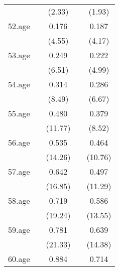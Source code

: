 {\begin{tabular}{l*{4}{c}}
            &                     &      (2.33)         &                     &      (1.93)         \\
[1em]
52.age      &                     &       0.176\sym{***}&                     &       0.187\sym{***}\\
            &                     &      (4.55)         &                     &      (4.17)         \\
[1em]
53.age      &                     &       0.249\sym{***}&                     &       0.222\sym{***}\\
            &                     &      (6.51)         &                     &      (4.99)         \\
[1em]
54.age      &                     &       0.314\sym{***}&                     &       0.286\sym{***}\\
            &                     &      (8.49)         &                     &      (6.67)         \\
[1em]
55.age      &                     &       0.480\sym{***}&                     &       0.379\sym{***}\\
            &                     &     (11.77)         &                     &      (8.52)         \\
[1em]
56.age      &                     &       0.535\sym{***}&                     &       0.464\sym{***}\\
            &                     &     (14.26)         &                     &     (10.76)         \\
[1em]
57.age      &                     &       0.642\sym{***}&                     &       0.497\sym{***}\\
            &                     &     (16.85)         &                     &     (11.29)         \\
[1em]
58.age      &                     &       0.719\sym{***}&                     &       0.586\sym{***}\\
            &                     &     (19.24)         &                     &     (13.55)         \\
[1em]
59.age      &                     &       0.781\sym{***}&                     &       0.639\sym{***}\\
            &                     &     (21.33)         &                     &     (14.38)         \\
[1em]
60.age      &                     &       0.884\sym{***}&                     &       0.714\sym{***}\\

\end{tabular}}
